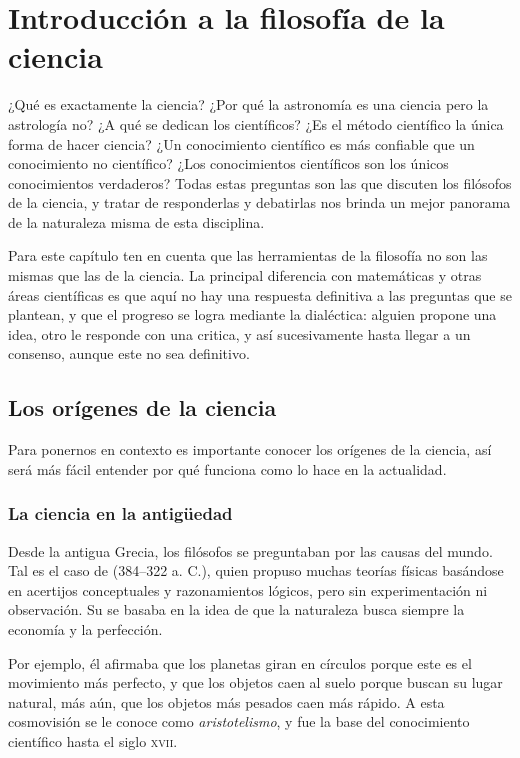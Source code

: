 \chapter{Introducción a la filosofía de la ciencia}
\label{cha:filosofiaciencia}

¿Qué es exactamente la ciencia?
¿Por qué la astronomía es una ciencia pero la astrología no?
¿A qué se dedican los científicos?
¿Es el método científico la única forma de hacer ciencia?
¿Un conocimiento científico es más confiable que un conocimiento no científico?
¿Los conocimientos científicos son los únicos conocimientos verdaderos?
Todas estas preguntas son las que discuten los filósofos de la ciencia, y tratar
de responderlas y debatirlas nos brinda un mejor panorama de la naturaleza misma
de esta disciplina.

Para este capítulo ten en cuenta que las herramientas de la filosofía no son
las mismas que las de la ciencia.
La principal diferencia con matemáticas y otras áreas científicas es que aquí no
hay una respuesta definitiva a las preguntas que se plantean, y que el progreso
se logra mediante la dialéctica:
alguien propone una idea, otro le responde con una critica, y así sucesivamente
hasta llegar a un consenso, aunque este no sea definitivo.

\section{Los orígenes de la ciencia}
\label{sec:losorigenesdelaciencia}

Para ponernos en contexto es importante conocer los orígenes de la ciencia, así
será más fácil entender por qué funciona como lo hace en la actualidad.

\subsection*{La ciencia en la antigüedad}
\label{sub:cienciaenlaantiguedad}
Desde la antigua Grecia, los filósofos se preguntaban por las causas del mundo.
Tal es el caso de  (384--322 a. C.), quien
propuso muchas teorías físicas basándose en acertijos conceptuales y
razonamientos lógicos, pero sin experimentación ni
observación\cite{Shields2023}.
Su  se basaba en la idea de que la naturaleza busca
siempre la economía y la perfección.

Por ejemplo, él afirmaba que los planetas giran en círculos porque este es el
movimiento más perfecto, y que los objetos caen al suelo porque buscan su lugar
natural, más aún, que los objetos más pesados caen más rápido.
A esta cosmovisión se le conoce como \emph{aristotelismo}, y fue la base del
conocimiento científico hasta el siglo \textsc{xvii}.

